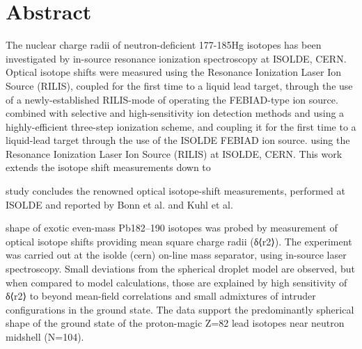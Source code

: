 \section{Abstract}
The nuclear charge radii of neutron-deficient 177-185Hg isotopes has been investigated by in-source resonance ionization spectroscopy at ISOLDE, CERN.  Optical isotope shifts were measured using the Resonance Ionization Laser Ion Source (RILIS), coupled for the first time to a liquid lead target, through the use of a newly-established RILIS-mode of operating the FEBIAD-type ion source.  combined with selective and high-sensitivity ion detection methods  and  using a highly-efficient three-step ionization scheme, and coupling it for the first time to a liquid-lead target through the use of the ISOLDE FEBIAD ion source.  using the Resonance Ionization Laser Ion Source (RILIS) at ISOLDE, CERN.  This work extends  the isotope shift measurements down to 

study concludes the renowned optical isotope-shift measurements, performed at ISOLDE and reported by Bonn et al. and Kuhl et al.

shape of exotic even-mass Pb182–190 isotopes was probed by measurement of optical isotope shifts providing mean square charge radii (δ⟨r2⟩). The experiment was carried out at the isolde (cern) on-line mass separator, using in-source laser spectroscopy. Small deviations from the spherical droplet model are observed, but when compared to model calculations, those are explained by high sensitivity of δ⟨r2⟩ to beyond mean-field correlations and small admixtures of intruder configurations in the ground state. The data support the predominantly spherical shape of the ground state of the proton-magic Z=82 lead isotopes near neutron midshell (N=104).